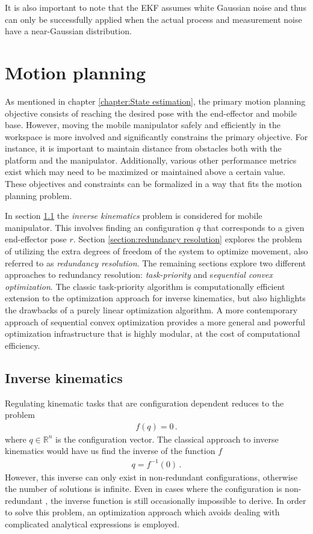 \documentclass[times, utf8, diplomski, english]{fer}
\begin{document}
It is also important to note that the EKF assumes white Gaussian noise and thus can only be successfully applied when the actual process and measurement noise have a near-Gaussian distribution.


\chapter{Motion planning}\label{chapter:motion planning}
As mentioned in chapter \ref{chapter:State estimation}, the primary motion planning objective consists of reaching the desired pose with the end-effector and mobile base.
However, moving the mobile manipulator safely and efficiently in the workspace is more involved and significantly constrains the primary objective. 
For instance, it is important to maintain distance from obstacles both with the platform and the manipulator.
Additionally, various other performance metrics exist which may need to be maximized or maintained above a certain value.
These objectives and constraints can be formalized in a way that fits the motion planning problem.

In section \ref{section:inverse kinematics} the \textit{inverse kinematics} problem is considered for mobile manipulator.
This involves finding an configuration $q$ that corresponds to a given end-effector pose $r$.
Section \ref{section:redundancy resolution} explores the problem of utilizing the extra degrees of freedom of the system to optimize movement, also referred to as \textit{redundancy resolution}.
The remaining sections explore two different approaches to redundancy resolution: \textit{task-priority} and s\textit{equential convex optimization}. 
The classic task-priority algorithm is computationally efficient extension to the optimization approach for inverse kinematics, but also highlights the drawbacks of a purely linear optimization algorithm.
A more contemporary approach of sequential convex optimization provides a more general and powerful optimization infrastructure that is highly modular, at the cost of computational efficiency.
\section{Inverse kinematics}\label{section:inverse kinematics}
Regulating kinematic tasks that are configuration dependent reduces to the problem
\begin{align}
f\left(q\right) = 0 \, . %
\end{align}
where $q \in \mathbb{R}^{n} $  is the configuration vector. 
The classical approach to inverse kinematics would have us find the inverse of the function $f$
\begin{align}
q = f^{-1}\left(0\right)\, . \label{eq:inverse}
\end{align}
However, this inverse can only exist in non-redundant configurations, otherwise the number of solutions is infinite.
Even in cases where the configuration is non-redundant , the inverse function is still occasionally impossible to derive.
In order to solve this problem, an optimization approach which avoids dealing with complicated analytical expressions is employed.
\end{document}
